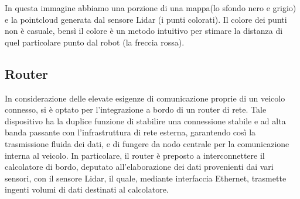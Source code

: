 \noindent In questa immagine abbiamo una porzione di una mappa(lo sfondo nero e grigio) e la pointcloud generata dal sensore Lidar (i punti colorati). Il colore dei punti non è casuale, bensì il colore è un metodo intuitivo per stimare la distanza di quel particolare punto dal robot (la freccia rossa).

\subsection{Router}
In considerazione delle elevate esigenze di comunicazione proprie di un veicolo connesso, si è optato per l'integrazione a bordo di un router di rete. Tale dispositivo ha la duplice funzione di stabilire una connessione stabile e ad alta banda passante con l'infrastruttura di rete esterna, garantendo così la trasmissione fluida dei dati, e di fungere da nodo centrale per la comunicazione interna al veicolo. In particolare, il router è preposto a interconnettere il calcolatore di bordo, deputato all'elaborazione dei dati provenienti dai vari sensori, con il sensore Lidar, il quale, mediante interfaccia Ethernet, trasmette ingenti volumi di dati destinati al calcolatore.

